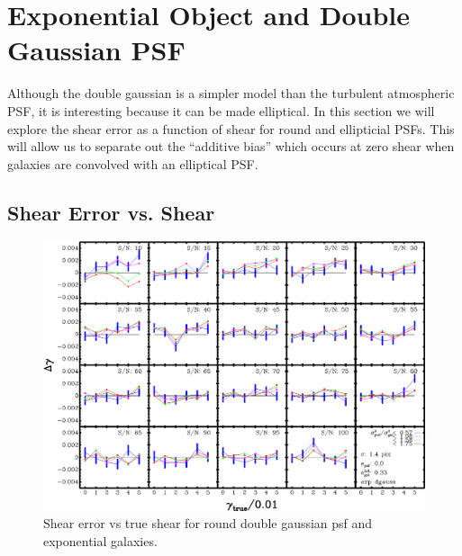 \documentclass[12pt,preprint]{aastex}
\begin{document}
\section{Exponential Object and Double Gaussian PSF}

Although the double gaussian is a simpler model than the turbulent atmospheric PSF,
it is interesting because it can be made elliptical.  In this section we will explore
the shear error as a function of shear for round and ellipticial PSFs. This will allow
us to separate out the ``additive bias'' which occurs at zero shear when galaxies
are convolved with an elliptical PSF.

\subsection{Shear Error vs. Shear}

\begin{figure}[t] \centering
 \centering 
 \includegraphics[scale=1]{figures/set-edg02-yr-0.005-0.005-vs-shear.eps}

 \caption{Shear error vs true shear for round double gaussian psf and
 exponential galaxies.}
 \label{fig:edgdiffvsshroundpsf}

\end{figure}
\end{document}
